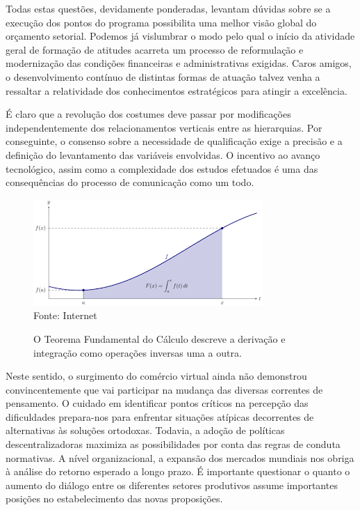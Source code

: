 \documentclass[fleqn]{profmat-cefet}
\begin{document}
Todas estas questões, devidamente ponderadas, levantam dúvidas sobre se a
execução dos pontos do programa possibilita uma melhor visão global do orçamento
setorial. Podemos já vislumbrar o modo pelo qual o início da atividade geral de
formação de atitudes acarreta um processo de reformulação e modernização das
condições financeiras e administrativas exigidas. Caros amigos, o
desenvolvimento contínuo de distintas formas de atuação talvez venha a ressaltar
a relatividade dos conhecimentos estratégicos para atingir a excelência. 

É claro que a revolução dos costumes deve passar por modificações
independentemente dos relacionamentos verticais entre as hierarquias. Por
conseguinte, o consenso sobre a necessidade de qualificação exige a precisão e a
definição do levantamento das variáveis envolvidas. O incentivo ao avanço
tecnológico, assim como a complexidade dos estudos efetuados é uma das
consequências do processo de comunicação como um todo. 

\begin{figure}
  \centering
  \caption[Teorema Fundamental do Cálculo] %
          {O Teorema Fundamental do Cálculo descreve a derivação e integração como operações inversas uma a outra.}
  \label{fig:calculus}
  \includegraphics[width=.5\linewidth]{figs/calculus}
  \\ Fonte: Internet
\end{figure}

Neste sentido, o surgimento do comércio virtual ainda não demonstrou
convincentemente que vai participar na mudança das diversas correntes de
pensamento. O cuidado em identificar pontos críticos na percepção das
dificuldades prepara-nos para enfrentar situações atípicas decorrentes de
alternativas às soluções ortodoxas. Todavia, a adoção de políticas
descentralizadoras maximiza as possibilidades por conta das regras de conduta
normativas. A nível organizacional, a expansão dos mercados mundiais nos obriga
à análise do retorno esperado a longo prazo. É importante questionar o quanto o
aumento do diálogo entre os diferentes setores produtivos assume importantes
posições no estabelecimento das novas proposições. 
\end{document}
